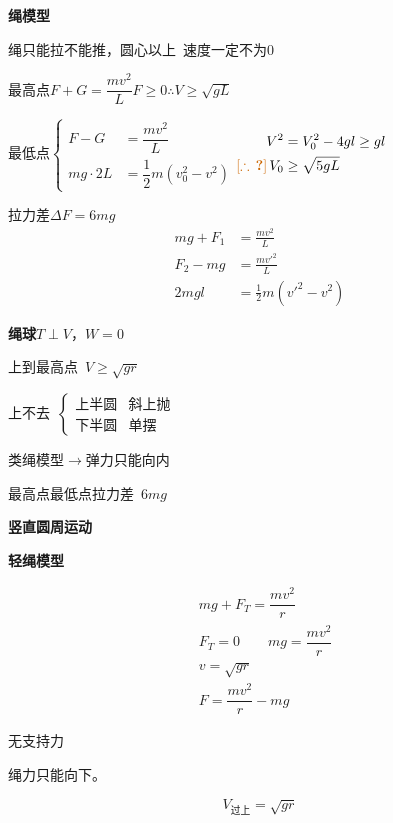 \textbf{绳模型}
\par 绳只能拉不能推，圆心以上\ 速度一定不为0
\par 最高点\quad $F+G=\dfrac{mv^2}{L}$\qquad $F\ge0$\quad $\therefore V\ge\sqrt{gL}$
\par 最低点\quad $\left\{\begin{aligned}F-G&=\dfrac{mv^2}{L}\\ mg\cdot2L&=\dfrac{1}{2}m(v_0^2-v^2)\end{aligned}\right.$\qquad $\begin{aligned}V^2&=V_0^2-4gl\ge gl\\ \unclear{\therefore}\,V_0&\ge\sqrt{5gL}\end{aligned}$
\par 拉力差\quad $\Delta F=6mg$
\begin{align*}
mg+F_1&=\frac{mv^2}{L}\\
F_2-mg&=\frac{mv'^2}{L}\\
2mgl&=\frac{1}{2}m(v'^2-v^2)
\end{align*}

\textbf{绳球}\quad $T\perp V$，$W=0$

上到最高点\ $V\ge\sqrt{gr}$


上不去\ $\left\{\begin{array}{ll}\text{上半圆} & \text{斜上抛}\\ \text{下半圆} & \text{单摆}\end{array}\right.$

类绳模型$\to$弹力只能向内

最高点最低点拉力差\ $6mg$

\textbf{竖直圆周运动}

\textbf{轻绳模型}


\begin{align*}
& mg+F_T=\dfrac{mv^2}{r}\\
& F_T=0\qquad mg=\dfrac{mv^2}{r}\\
& v=\sqrt{gr}\\
& F=\dfrac{mv^2}{r}-mg
\end{align*}

无支持力

绳力只能向下。

\[ V_{\text{过上}}=\sqrt{gr} \]

